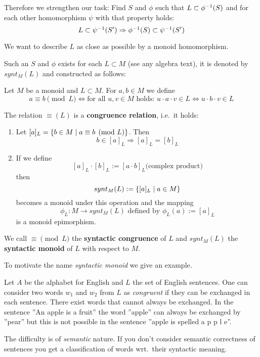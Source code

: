 Therefore we strengthen our task: Find $S$ and $\phi$ such that $L \subset
\mbox{${\phi}^{-1}$}(S)$ and for each other homomorphism $\psi$ with that property
holds:
\[ L \subset \mbox{${\psi}^{-1}$}(S') \Rightarrow \mbox{${\phi}^{-1}$}(S) \subset \mbox{${\psi}^{-1}$}(S') \]

We want to describe $L$ as close as possible by a monoid homomorphism.

Such an $S$ and $\phi$ exists for each $L \subset M$ (see any algebra text), it
is denoted by $synt_M(L)$ and constructed as follows:

\begin{definition}
Let $M$ be a monoid and $L \subset M$. For $a, b \in M$ we define
\[ a \equiv b\pmod{L} \iff \text{for all }u, v \in M\text{ holds: } u \cdot a
\cdot v \in L \Leftrightarrow u \cdot b \cdot v \in L \]
\end{definition}

The relation $\equiv (L)$ is a {\bf congruence relation}, i.e.\ it holds:
\begin{enumerate}

  \item Let $[a]_L = \mbox{$\{b \in M \mid a \equiv b\pmod{L}\}$}$. Then
  \[ b \in [a]_L \Rightarrow [a]_L = [b]_L \]
  
  \item If we define
  \[ [a]_L \cdot [b]_L := [a \cdot b]_L \text{(complex product)} \]
  then
  \[synt_M(L) := \mbox{$\{[a]_L \mid a \in M\}$} \]
  becomes a monoid under this operation and the mapping 
  \[\phi_L : M \to synt_M(L) \text{ defined by } \phi_L(a) := [a]_L\]
  is a monoid epimorphism.
\end{enumerate}

We call $\equiv\pmod{L}$ the {\bf syntactic congruence} of $L$ and
$synt_M(L)$ the {\bf syntactic monoid} of $L$ with respect to $M$.

To motivate the name {\em syntactic monoid} we give an example.

Let $A$ be the alphabet for English and $L$ the set of English sentences.
One can consider two words $w_1$ and $w_2$ from $L$ as {\em congruent} if they
can be exchanged in each sentence. There exist words that cannot always be exchanged. 
In the sentence ''An apple is a fruit'' the word ''apple'' can always be
exchanged by ''pear'' but this is not possible in the sentence ''apple is
spelled a p p l e''.

The difficulty is of {\em semantic} nature. If you don't consider semantic
correctness of sentences you get a classification of words wrt.\ their syntactic
meaning.

